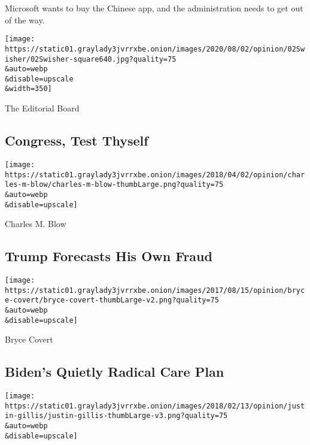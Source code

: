 Microsoft wants to buy the Chinese app, and the administration needs to
get out of the way.

\href{/2020/08/02/opinion/02tik-tok-china-trump.html}{}

\texttt{[image: https://static01.graylady3jvrrxbe.onion/images/2020/08/02/opinion/02Swisher/02Swisher-square640.jpg?quality=75\\\&auto=webp\\\&disable=upscale\\\&width=350]}

\href{/2020/08/02/opinion/coronavirus-gohmert-congress-testing.html}{}

The Editorial Board

\hypertarget{congress-test-thyself}{%
\subsection{Congress, Test Thyself}\label{congress-test-thyself}}

\href{/2020/08/02/opinion/trump-2020-election.html}{}

\texttt{[image: https://static01.graylady3jvrrxbe.onion/images/2018/04/02/opinion/charles-m-blow/charles-m-blow-thumbLarge.png?quality=75\\\&auto=webp\\\&disable=upscale]}

Charles M. Blow

\hypertarget{trump-forecasts-his-own-fraud}{%
\subsection{Trump Forecasts His Own
Fraud}\label{trump-forecasts-his-own-fraud}}

\href{/2020/08/02/opinion/biden-child-care.html}{}

\texttt{[image: https://static01.graylady3jvrrxbe.onion/images/2017/08/15/opinion/bryce-covert/bryce-covert-thumbLarge-v2.png?quality=75\\\&auto=webp\\\&disable=upscale]}

Bryce Covert

\hypertarget{bidens-quietly-radical-care-plan}{%
\subsection{Biden's Quietly Radical Care
Plan}\label{bidens-quietly-radical-care-plan}}

\href{/2020/08/02/opinion/utility-corruption-energy.html}{}

\texttt{[image: https://static01.graylady3jvrrxbe.onion/images/2018/02/13/opinion/justin-gillis/justin-gillis-thumbLarge-v3.png?quality=75\\\&auto=webp\\\&disable=upscale]}

